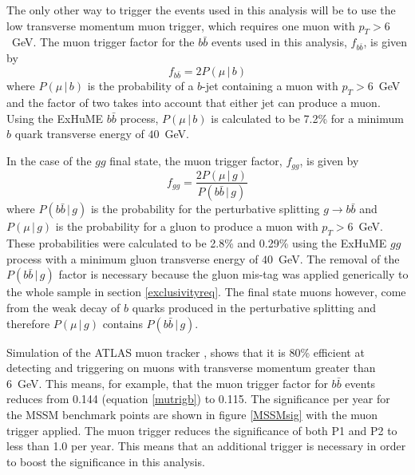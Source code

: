 The only other way to trigger the events used in this analysis will be to use the low transverse momentum muon trigger, which requires one muon with $p_T>6$~GeV. 
The muon trigger factor for the $b\bar{b}$ events used in this analysis, $f_{b\bar{b}}$, is given by 
\begin{equation}\label{mutrigb}
f_{b\bar{b}}=2P(\mu \, | \, b)
\end{equation}
where $P(\mu \, | \, b)$ is the probability of a $b$-jet containing a muon with $p_T>6$~GeV and the factor of two takes into account that either jet can produce a muon. Using the ExHuME $b\bar{b}$ process, $P(\mu \, | \, b)$ is calculated to be 7.2\% for a minimum $b$ quark transverse energy of $40$~GeV. 

In the case of the $gg$ final state, the muon trigger factor, $f_{gg}$, is given by
\begin{equation} \label{glutrig}
f_{gg} = \frac{2 P(\mu \, | \, g)}{P(b\bar{b} \, | \, g)}
\end{equation}
where $P(b\bar{b} \, | \, g)$ is the probability for the perturbative splitting $g\rightarrow b\bar{b}$ and $P(\mu \, | \, g)$ is the probability for a gluon to produce  a muon with $p_T>6$~GeV. These probabilities were calculated to be 2.8\% and 0.29\% using the ExHuME $gg$ process with a minimum gluon transverse energy of $40$~GeV. The removal of the $P(b\bar{b} \, | \, g)$ factor is necessary because the gluon mis-tag was applied generically to the whole sample in section \ref{exclusivityreq}. The final state muons however, come from the weak decay of $b$ quarks produced in the perturbative splitting and therefore $P(\mu \, | \, g)$ contains $P(b\bar{b} \, | \, g)$. 

Simulation of the ATLAS muon tracker \cite{:1999fq:Chapter11}, shows that it is 80\% efficient at detecting and triggering on muons with transverse momentum greater than 6~GeV. This means, for example, that the muon trigger factor for $b\bar{b}$ events reduces from 0.144 (equation \ref{mutrigb}) to 0.115. The significance per year for the MSSM benchmark points are shown in figure \ref{MSSMsig} with the muon trigger applied. The muon trigger reduces the significance of both P1 and P2 to less than 1.0 per year. This means that an additional trigger is necessary in order to boost the significance in this analysis.

